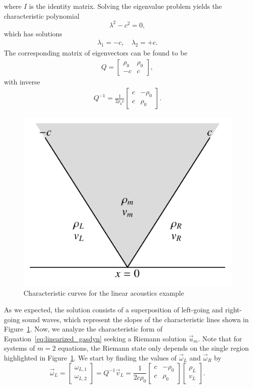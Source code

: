 where $I$ is the identity matrix. Solving the eigenvalue problem yields the characteristic polynomial 
\begin{equation}
	\lambda^2 - c^2 = 0,
\end{equation}
which has solutions 
\begin{align}
	\lambda_1 = -c, \quad
	\lambda_2 = +c.
\end{align}
The corresponding matrix of eigenvectors can be found to be
\begin{align}
	Q = 
	\begin{bmatrix}
		\rho_0 & \rho_0 \\
		-c & c
	\end{bmatrix},
\end{align}
with inverse
\begin{align}
	Q^{-1}= 
	\frac{1}{2\rho_0 c}
	\begin{bmatrix}
		c & -\rho_0 \\
		c & \rho_0
	\end{bmatrix}.
\end{align}
\begin{figure}[htbp]
	\centering
	\includegraphics[width=0.5\linewidth]{Pictures/ch11_riem_linacoustics_characteristics}
	\caption{Characteristic curves for the linear acoustics example}
	\label{fig:acoustics_charact}
\end{figure}
As we expected, the solution consists of a superposition of left-going and right-going sound waves, which represent the slopes of the characteristic lines shown in Figure~\ref{fig:acoustics_charact}. Now, we analyze the characteristic form of Equation~\ref{eq:linearized_gasdyn} seeking a Riemann solution $\vec u_m$. Note that for systems of $m=2$ equations, the Riemann state only depends on the single region highlighted in Figure~\ref{fig:acoustics_charact}. We start by finding the values of $\vec \omega_L$ and $\vec \omega_R$ by
\begin{equation}
	\vec \omega_L = 
	\begin{bmatrix}
		\omega_{L,1} \\ \omega_{L,2}
	\end{bmatrix}
	= Q^{-1} \vec v_L = \frac{1}{2c\rho_0}
	\begin{bmatrix}
		c & -\rho_0 \\
		c & \rho_0 
	\end{bmatrix}
	\begin{bmatrix}
		\rho_L \\ v_L
	\end{bmatrix}.
\end{equation}
